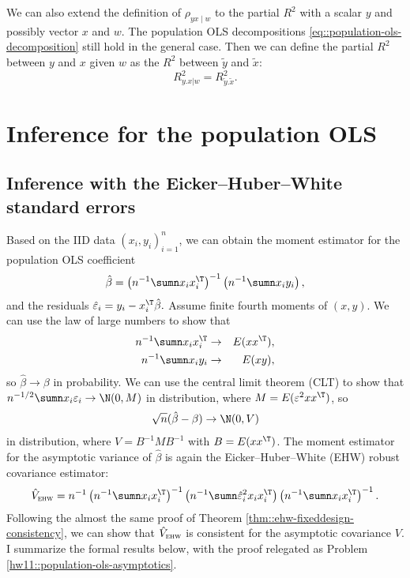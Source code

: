 We can also extend the definition of $\rho_{yx\mid w}$ to the partial $R^2$ with a scalar $y$ and possibly vector $x$ and $w$. The population OLS decompositions \eqref{eq::population-ols-decomposition} still hold in the general case. Then we can define the partial $R^2$ between $y$ and $x$ given $w$ as the $R^2$ between $ \tilde{y}$ and $  \tilde{x}$: 
$$
R^2_{y.x|w} = R^2_{ \tilde{y}.  \tilde{x}  } . 
$$



 
 

\section{Inference for the population OLS}


\subsection{Inference with the Eicker--Huber--White standard errors}
Based on the IID data $(x_{i},y_{i})_{i=1}^{n}$, we can
obtain the moment estimator for the population OLS coefficient
\[
\hat{\beta}=\left(n^{-1}\sumn x_{i}x_{i}^{\T}\right)^{-1}\left(n^{-1}\sumn x_{i}y_{i}\right),
\]
and the residuals $ \hat{\varepsilon}_i = y_i - x_i^{\T} \hat{\beta} . $ Assume finite fourth moments of $(x,y)$. We can use the law of large numbers to show that 
\begin{eqnarray*}
n^{-1}\sumn x_{i}x_{i}^{\T} &\rightarrow & E(xx^{\T}), \\
n^{-1}\sumn x_{i}y_{i} &\rightarrow & E(xy) ,
\end{eqnarray*}
so $\hat{\beta}\rightarrow\beta$ in probability. We can use the central limit theorem (CLT) to show that $n^{-1/2}\sumn x_{i}\varepsilon_{i}\rightarrow\N(0,M)$ in distribution, where $M= E(\varepsilon^{2}xx^{\T})$,
so 
\begin{eqnarray}
\label{eq::ols-populationols-clt}
\sqrt{n}(\hat{\beta}-\beta)\rightarrow\N ( 0, V  )
\end{eqnarray}
in distribution, where $V =  B^{-1} M B^{-1}$ with $B =   E(xx^{\T}) $. 
The moment estimator for the asymptotic variance of $\hat{\beta}$ is again
 the Eicker--Huber--White (EHW) robust covariance
estimator:
\begin{eqnarray}
\label{eq::ehw-populationols}
\hat{V}_{\textsc{ehw}} =  
n^{-1}
\left(n^{-1}\sumn x_{i}x_{i}^{\T}\right)^{-1}
\left(n^{-1}\sumn  \hat{\varepsilon}_i^2  x_{i}x_{i}^{\T}\right) 
\left(n^{-1}\sumn x_{i}x_{i}^{\T}\right)^{-1} .
\end{eqnarray}
Following the almost the same proof of Theorem \ref{thm::ehw-fixeddesign-consistency}, we can show that $\hat{V}_{\textsc{ehw}} $ is consistent for the asymptotic covariance $V$. I summarize the formal results below, with the proof relegated as Problem \ref{hw11::population-ols-asymptotics}. 





